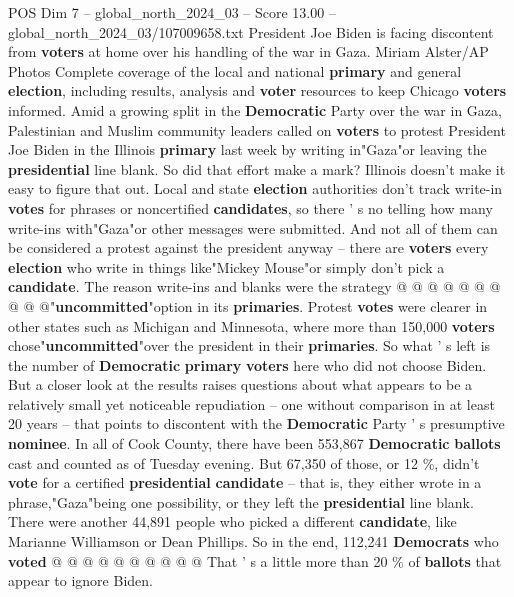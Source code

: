 \begin{textsample}{POS Dim 7 – global\_north\_2024\_03 – Score 13.00 – global\_north\_2024\_03/107009658.txt}  \label{ex:f7_pos_035}
President Joe Biden is facing discontent from \textbf{voters} at home over his handling of the war in Gaza.
Miriam Alster/AP Photos Complete coverage of the local and national \textbf{primary} and general \textbf{election}, including results, analysis and \textbf{voter} resources to keep Chicago \textbf{voters} informed.
Amid a growing split in the \textbf{Democratic} Party over the war in Gaza, Palestinian and Muslim community leaders called on \textbf{voters} to protest President Joe Biden in the Illinois \textbf{primary} last week by writing in"Gaza"or leaving the \textbf{presidential} line blank.
So did that effort make a mark?
Illinois doesn't make it easy to figure that out.
Local and state \textbf{election} authorities don't track write-in \textbf{votes} for phrases or noncertified \textbf{candidates}, so there ' s no telling how many write-ins with"Gaza"or other messages were submitted.
And not all of them can be considered a protest against the president anyway -- there are \textbf{voters} every \textbf{election} who write in things like"Mickey Mouse"or simply don't pick a \textbf{candidate}.
The reason write-ins and blanks were the strategy @ @ @ @ @ @ @ @ @ @"\textbf{uncommitted}"option in its \textbf{primaries}.
Protest \textbf{votes} were clearer in other states such as Michigan and Minnesota, where more than 150,000 \textbf{voters} chose"\textbf{uncommitted}"over the president in their \textbf{primaries}.
So what ' s left is the number of \textbf{Democratic} \textbf{primary} \textbf{voters} here who did not choose Biden.
But a closer look at the results raises questions about what appears to be a relatively small yet noticeable repudiation -- one without comparison in at least 20 years -- that points to discontent with the \textbf{Democratic} Party ' s presumptive \textbf{nominee}.
In all of Cook County, there have been 553,867 \textbf{Democratic} \textbf{ballots} cast and counted as of Tuesday evening.
But 67,350 of those, or 12 \%, didn't \textbf{vote} for a certified \textbf{presidential} \textbf{candidate} -- that is, they either wrote in a phrase,"Gaza"being one possibility, or they left the \textbf{presidential} line blank.
There were another 44,891 people who picked a different \textbf{candidate}, like Marianne Williamson or Dean Phillips.
So in the end, 112,241 \textbf{Democrats} who \textbf{voted} @ @ @ @ @ @ @ @ @ @ That ' s a little more than 20 \% of \textbf{ballots} that appear to ignore Biden.

\end{textsample}
